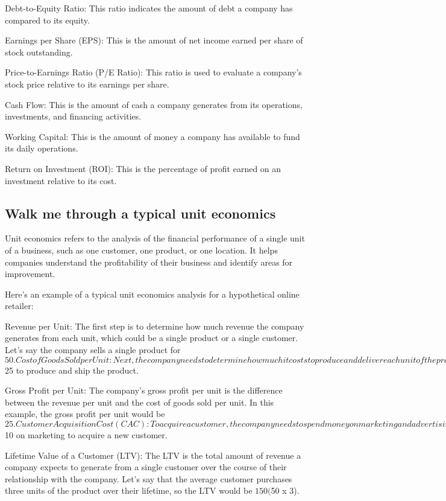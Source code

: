 \documentclass[12pt, a4paper, oneside]{article}
\begin{document}
Debt-to-Equity Ratio: This ratio indicates the amount of debt a company has compared to its equity.

Earnings per Share (EPS): This is the amount of net income earned per share of stock outstanding.

Price-to-Earnings Ratio (P/E Ratio): This ratio is used to evaluate a company's stock price relative to its earnings per share.

Cash Flow: This is the amount of cash a company generates from its operations, investments, and financing activities.

Working Capital: This is the amount of money a company has available to fund its daily operations.

Return on Investment (ROI): This is the percentage of profit earned on an investment relative to its cost.
\subsection{ Walk me through a typical unit economics
 }
Unit economics refers to the analysis of the financial performance of a single unit of a business, such as one customer, one product, or one location. It helps companies understand the profitability of their business and identify areas for improvement.

Here's an example of a typical unit economics analysis for a hypothetical online retailer:

Revenue per Unit: The first step is to determine how much revenue the company generates from each unit, which could be a single product or a single customer. Let's say the company sells a single product for $50.

Cost of Goods Sold per Unit: Next, the company needs to determine how much it costs to produce and deliver each unit of the product. For example, let's say it costs $25 to produce and ship the product.

Gross Profit per Unit: The company's gross profit per unit is the difference between the revenue per unit and the cost of goods sold per unit. In this example, the gross profit per unit would be $25.

Customer Acquisition Cost (CAC): To acquire a customer, the company needs to spend money on marketing and advertising. Let's say the company spends $10 on marketing to acquire a new customer.

Lifetime Value of a Customer (LTV): The LTV is the total amount of revenue a company expects to generate from a single customer over the course of their relationship with the company. Let's say that the average customer purchases three units of the product over their lifetime, so the LTV would be $150 ($50 x 3).
\end{document}

